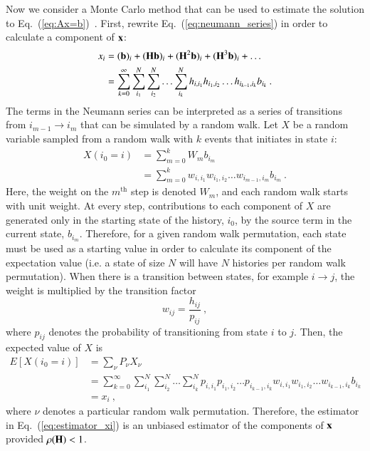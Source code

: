 \documentclass[preprint,12pt]{elsarticle}
\newcommand{\vb}{\ensuremath{\ve{b}}}
\newcommand{\vx}{\ensuremath{\ve{x}}}
\newcommand{\vH}{\ensuremath{\ve{H}}}
\begin{document}
Now we consider a Monte Carlo method that can be used to estimate the
solution to Eq.~(\ref{eq:Ax=b})~\cite{hammersley_1964}.  First,
rewrite Eq.~(\ref{eq:neumann_series}) in order to calculate a
component of $\vx$:
\begin{equation}
  \begin{split}
    x_i &= (\vb)_i + (\vH\vb)_i + (\vH^2\vb)_i + (\vH^3\vb)_i +
    \ldots\\ &= \sum_{k=0}^{\infty}\sum_{i_1}^{N}\sum_{i_2}^{N}\ldots
    \sum_{i_k}^{N}h_{i,i_1}h_{i_1,i_2}\ldots h_{i_{k-1},i_k}b_{i_k}\:.
  \end{split}
  \label{eq:neumann_series_i}
\end{equation}
The terms in the Neumann series can be interpreted as a series of
transitions from $i_{m-1}\rightarrow i_m$ that can be simulated by a
random walk.  Let $X$ be a random variable sampled from a random walk
with $k$ events that initiates in state $i$:
\begin{equation}
  \begin{split}
    X(i_0 = i) &= \sum_{m=0}^{k}W_m b_{i_m}\\ &=
    \sum_{m=0}^{k}w_{i,i_1}w_{i_1,i_2}\ldots w_{i_{m-1},i_m}b_{i_m}\:.
  \end{split}
  \label{eq:estimator_xi}
\end{equation}
Here, the weight on the $m^\text{th}$ step is denoted $W_m$, and each
random walk starts with unit weight. At every step, contributions to
each component of $X$ are generated only in the starting state of the
history, $i_0$, by the source term in the current state,
$b_{i_m}$. Therefore, for a given random walk permutation, each state
must be used as a starting value in order to calculate its component
of the expectation value (i.e. a state of size $N$ will have $N$
histories per random walk permutation). When there is a transition
between states, for example $i\rightarrow j$, the weight is multiplied
by the transition factor
\begin{equation}
  w_{ij} = \frac{h_{ij}}{p_{ij}}\:,
  \label{eq:weight}
\end{equation}
where $p_{ij}$ denotes the probability of transitioning from state $i$
to $j$. Then, the expected value of $X$ is
\begin{equation}
  \begin{split}
    E[X(i_0=i)] &= \sum_{\nu}P_\nu X_\nu\\ &=
    \sum_{k=0}^{\infty}\sum_{i_1}^{N}\sum_{i_2}^{N}\ldots
    \sum_{i_k}^{N}p_{i,i_1}p_{i_1,i_2}\ldots p_{i_{k-1},i_k}
    w_{i,i_1}w_{i_1,i_2}\dots w_{i_{k-1},i_k}b_{i_k}\\ &= x_i\:,
  \end{split}
  \label{eq:expectation_xi}
\end{equation}
where $\nu$ denotes a particular random walk permutation.  Therefore,
the estimator in Eq.~(\ref{eq:estimator_xi}) is an unbiased estimator
of the components of $\vx$ provided $\rho(\vH) < 1$.
\end{document}
